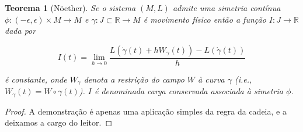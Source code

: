 \documentclass[12pt, a4paper]{article}
\newtheorem{teorema}{Teorema }
\begin{document}
\begin{teorema}[Nöether] Se o sistema $(M, L)$ admite uma simetria contínua $\phi:(-\epsilon, \epsilon) \times M \rightarrow M$ e $\gamma: J \subset \mathbb{R} \rightarrow M$ é movimento físico então a função $I: J \rightarrow \mathbb{R}$ dada por

\begin{equation} 
I(t) = \lim_{h \to 0} \frac{L(\dot{\gamma}(t) + hW_\gamma(t)) - L(\dot{\gamma}(t))}{h} 
\end{equation}

\noindent é constante, onde $W_\gamma$ denota a restrição do campo $W$ à curva $\gamma$ (i.e., $W_{\gamma}(t) = W \circ \gamma(t)$). $I$ é denominada carga conservada associada à simetria $\phi$.

\end{teorema}

\begin{proof} A demonstração é apenas uma aplicação simples da regra da cadeia, e a deixamos a cargo do leitor. \end{proof}
\end{document}
